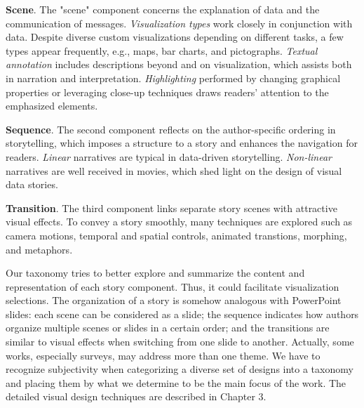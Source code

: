 \begin{compactitem}
	\item \textbf{Scene}. The "scene" component concerns the explanation of data and the communication of messages. \textit{Visualization types} work closely in conjunction with data. Despite diverse custom visualizations depending on different tasks, a few types appear frequently, e.g., maps, bar charts, and pictographs. \textit{Textual annotation} includes descriptions beyond and on visualization, which assists both in narration and interpretation. \textit{Highlighting} performed by changing graphical properties or leveraging close-up techniques draws readers' attention to the emphasized elements.
	
	\item \textbf{Sequence}. The second component reflects on the author-specific ordering in storytelling, which imposes a structure to a story and enhances the navigation for readers. \textit{Linear} narratives are typical in data-driven storytelling. \textit{Non-linear} narratives are well received in movies, which shed light on the design of visual data stories. 

	\item \textbf{Transition}. The third component links separate story scenes with attractive visual effects. To convey a story smoothly, many techniques are explored such as camera motions, temporal and spatial controls, animated transtions, morphing, and metaphors. 
\end{compactitem}

Our taxonomy tries to better explore and summarize the content and representation of each story component. Thus, it could facilitate visualization selections. The organization of a story is somehow analogous with PowerPoint slides: each scene can be considered as a slide; the sequence indicates how authors organize multiple scenes or slides in a certain order; and the transitions are similar to visual effects when switching from one slide to another. Actually, some works, especially surveys, may address more than one theme. We have to recognize subjectivity when categorizing a diverse set of designs into a taxonomy and placing them by what we determine to be the main focus of the work. The detailed visual design techniques are described in Chapter 3.


\newpage